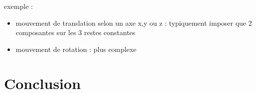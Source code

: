 \documentclass[12pt,a4paper,twoside]{article}
\begin{document}
exemple : 
\begin{itemize}
	\item mouvement de translation selon un axe x,y ou z : typiquement imposer que 2 composantes sur les 3 restes constantes
	\item mouvement de rotation : plus complexe
\end{itemize}



\newpage

\section{Conclusion}
\end{document}
